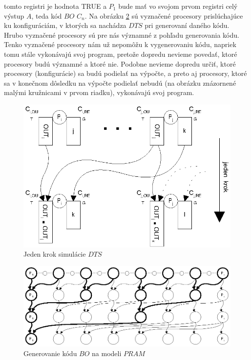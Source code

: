 \begin{dokaz}
\begin{itemize}
{    tomto registri je hodnota TRUE} a $P_1$ bude mať vo svojom prvom
    registri celý výstup $A$, teda kód $BO$ $C_n$.
    Na obrázku \ref{pram_obr_bopram2} sú vyznačené procesory prislúchajúce ku
    konfiguráciám, v ktorých sa nachádza $DTS$ pri generovaní daného
    kódu. Hrubo vyznačené procesory sú pre nás významné z pohľadu
    generovania kódu. Tenko vyznačené procesory nám už nepomôžu k
    vygenerovaniu kódu, napriek tomu stále vykonávajú svoj program,
    pretože dopredu nevieme povedať, ktoré procesory budú významné a
    ktoré nie. Podobne nevieme dopredu určiť, ktoré procesory
    (konfigurácie) sa budú podielať na výpočte, a preto aj procesory,
    ktoré sa v konečnom dôsledku na výpočte podielať nebudú (na
    obrázku znázornené malými kružnicami v prvom riadku), vykonávajú
    svoj program.

  \begin{figure}[!ht]
   \centering
   \includegraphics{img/pram/bopram1.eps}
   \caption{Jeden krok simulácie $DTS$} \label{pram_obr_bopram1}
  \end{figure}

  \begin{figure}[!ht]
   \centering
   \includegraphics{img/pram/bopram2.eps}
   \caption{Generovanie kódu $BO$ na modeli $PRAM$} \label{pram_obr_bopram2}
  \end{figure}


\end{itemize}
\end{dokaz}
